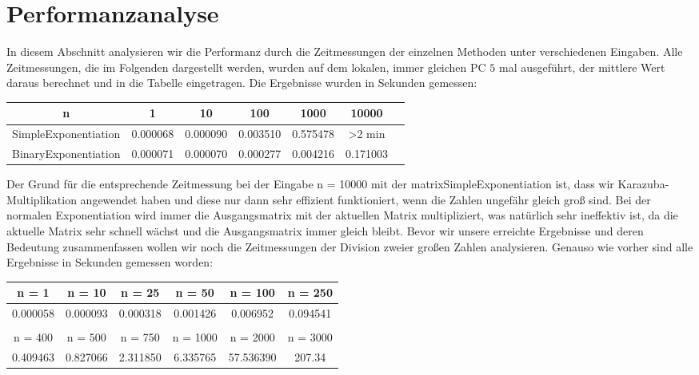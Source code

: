 \documentclass[course=erap]{aspdoc}
\begin{document}
\section{Performanzanalyse}
In diesem Abschnitt analysieren wir die Performanz durch die Zeitmessungen der einzelnen Methoden unter verschiedenen Eingaben. Alle Zeitmessungen, die im Folgenden dargestellt werden, wurden auf dem lokalen, immer gleichen PC $5$ mal ausgeführt, der mittlere Wert daraus berechnet und in die Tabelle eingetragen. Die Ergebnisse wurden in Sekunden gemessen:
\begin{center}
    \begin{tabular}{|c|c|c|c|c|c|c}
    \hline
 n & 1 & 10 & 100 & 1000 & 10000 \\
\hline
SimpleExponentiation & 0.000068 & 0.000090 & 0.003510 & 0.575478 & >2 min \\
\hline
BinaryExponentiation & 0.000071  & 0.000070  & 0.000277 & 0.004216 & 0.171003 \\ 
\hline
    \end{tabular}
\end{center}
Der Grund für die entsprechende Zeitmessung bei der Eingabe n = 10000 mit der matrixSimpleExponentiation ist, dass wir Karazuba-Multiplikation angewendet haben und diese nur dann sehr effizient funktioniert, wenn die Zahlen ungefähr gleich groß sind. Bei der normalen Exponentiation wird immer die Ausgangsmatrix mit der aktuellen Matrix multipliziert, was natürlich sehr ineffektiv ist, da die aktuelle Matrix sehr schnell wächst und die Ausgangsmatrix immer gleich bleibt.
Bevor wir unsere erreichte Ergebnisse und deren Bedeutung zusammenfassen wollen wir noch die Zeitmessungen der Division zweier großen Zahlen analysieren. Genauso wie vorher sind alle Ergebnisse in Sekunden gemessen worden:
\begin{center}
    \begin{tabular}{|c|c|c|c|c|c|}
    \hline
 n = 1 & n = 10 & n = 25 & n = 50 & n = 100 & n = 250 \\
\hline
0.000058 & 0.000093 & 0.000318 & 0.001426 & 0.006952 & 0.094541  \\
  \hline
  &&&&&\\
\hline
 n = 400 & n = 500 & n = 750 & n = 1000 & n = 2000 & n = 3000 \\
\hline
0.409463 & 0.827066 & 2.311850 & 6.335765 & 57.536390 & 207.34 \\
\hline
 \end{tabular}
 \end{center}
\end{document}
